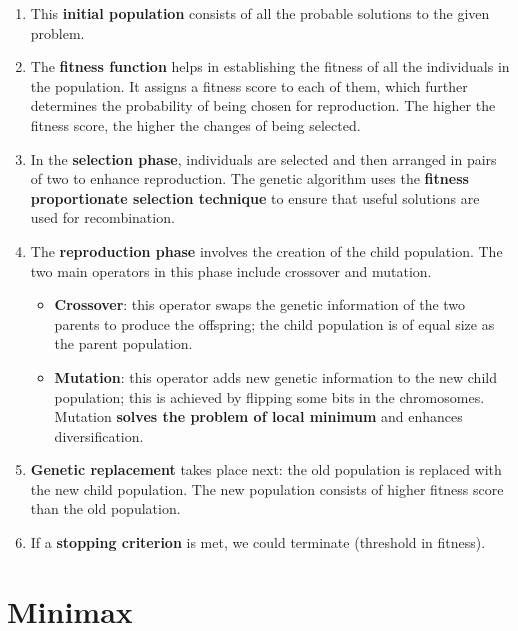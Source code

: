 \documentclass{article}
\begin{document}
\begin{enumerate}
    \item This \textbf{initial population} consists of all the probable solutions to the given problem.

    \item The \textbf{fitness function} helps in establishing the fitness of all the individuals in the population. It assigns a fitness score to each of them, which further determines the probability of being chosen for reproduction. The higher the fitness score, the higher the changes of being selected.

    \item In the \textbf{selection phase}, individuals are selected and then arranged in pairs of two to enhance reproduction. The genetic algorithm uses the \textbf{fitness proportionate selection technique} to ensure that useful solutions are used for recombination.

    \item The \textbf{reproduction phase} involves the creation of the child population. The two main operators in this phase include crossover and mutation.

    \begin{itemize}
        \item \textbf{Crossover}: this operator swaps the genetic information of the two parents to produce the offspring; the child population is of equal size as the parent population.
        \item \textbf{Mutation}: this operator adds new genetic information to the new child population; this is achieved by flipping some bits in the chromosomes. Mutation \textbf{solves the problem of local minimum} and enhances diversification.
    \end{itemize}

    \item \textbf{Genetic replacement} takes place next: the old population is replaced with the new child population. The new population consists of higher fitness score than the old population.

    \item If a \textbf{stopping criterion} is met, we could terminate (threshold in fitness).
\end{enumerate}

\newpage

\section{Minimax}
\end{document}
